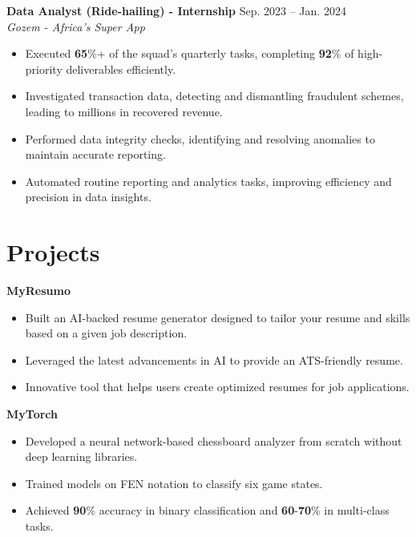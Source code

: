 \documentclass[letterpaper,11pt]{article}
\begin{document}
\textbf{Data Analyst (Ride-hailing) - Internship} \hfill Sep. 2023 -- Jan. 2024 \\
\textit{Gozem - Africa's Super App} \\
\begin{itemize}
    
    \item Executed \textbf{65}\%+ of the squad’s quarterly tasks, completing \textbf{92}\% of high-priority deliverables efficiently.
    
    \item Investigated transaction data, detecting and dismantling fraudulent schemes, leading to millions in recovered revenue.
    
    \item Performed data integrity checks, identifying and resolving anomalies to maintain accurate reporting.
    
    \item Automated routine reporting and analytics tasks, improving efficiency and precision in data insights.
    
\end{itemize}




\section*{Projects}

\textbf{MyResumo} \\
\begin{itemize}
    
    \item Built an AI-backed resume generator designed to tailor your resume and skills based on a given job description.
    
    \item Leveraged the latest advancements in AI to provide an ATS-friendly resume.
    
    
    \item Innovative tool that helps users create optimized resumes for job applications.
    
\end{itemize}

\textbf{MyTorch} \\
\begin{itemize}
    
    \item Developed a neural network-based chessboard analyzer from scratch without deep learning libraries.
    
    \item Trained models on FEN notation to classify six game states.
    
    
    \item Achieved \textbf{90}\% accuracy in binary classification and \textbf{60}-\textbf{70}\% in multi-class tasks.
    
\end{itemize}
\end{document}
